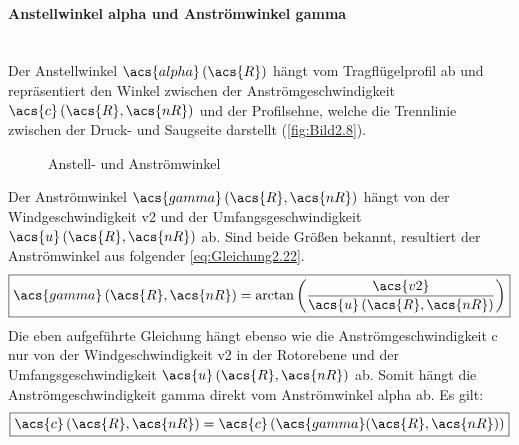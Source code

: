 \paragraph{Anstellwinkel \acs{alpha} und Anströmwinkel \acs{gamma}}\mbox{}\smallskip\\
Der Anstellwinkel $\acs{alpha}\left(\acs{R}\right)$ hängt vom Tragflügelprofil ab und repräsentiert den Winkel zwischen der Anströmgeschwindigkeit $\acs{c}\left(\acs{R}, \acs{nR}\right)$ und der Profilsehne, welche die Trennlinie zwischen der Druck- und Saugseite darstellt (\autoref{fig:Bild2.8}).
\begin{figure}[H]
   \centering
   \caption[Anstell- und Anströmwinkel]{Anstell- und Anströmwinkel \cite{SkriptSchulte}}
   \label{fig:Bild2.8}
\end{figure}

Der Anströmwinkel $\acs{gamma}\left(\acs{R}, \acs{nR}\right)$ hängt von der Windgeschwindigkeit \acs{v2} und der Umfangsgeschwindigkeit $\acs{u}\left(\acs{R}, \acs{nR}\right)$ ab. Sind beide Größen bekannt, resultiert der Anströmwinkel aus folgender \autoref{eq:Gleichung2.22}.
\begin{equation} \label{eq:Gleichung2.22}
	\boxed{\acs{gamma}\left(\acs{R}, \acs{nR}\right) = \arctan\left(\frac{\acs{v2}}{\acs{u}\left(\acs{R}, \acs{nR}\right)}\right)}
\end{equation}
\newline
Die eben aufgeführte Gleichung hängt ebenso wie die Anströmgeschwindigkeit \acs{c} nur von der Windgeschwindigkeit \acs{v2} in der Rotorebene und der Umfangsgeschwindigkeit $\acs{u}\left(\acs{R}, \acs{nR}\right)$ ab. Somit hängt die Anströmgeschwindigkeit \acs{gamma} direkt vom Anströmwinkel \acs{alpha} ab. Es gilt:
\begin{equation} \label{eq:Gleichung2.23}
	\boxed{\acs{c}\left(\acs{R}, \acs{nR}\right) = \acs{c}\left(\acs{gamma}(\acs{R}, \acs{nR})\right)}
\end{equation}

